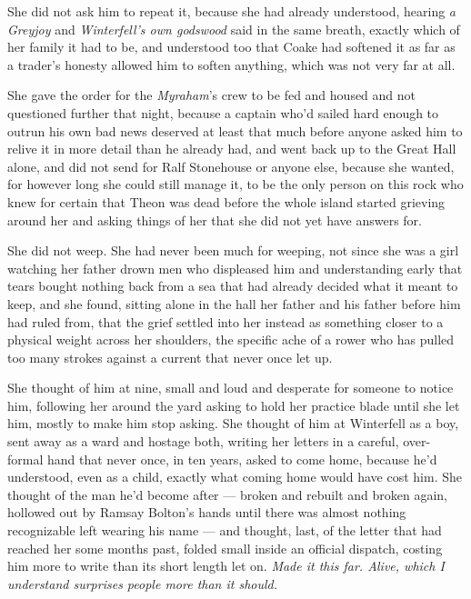 She did not ask him to repeat it, because she had already understood, hearing \textit{a Greyjoy} and \textit{Winterfell’s own godswood} said in the same breath, exactly which of her family it had to be, and understood too that Coake had softened it as far as a trader’s honesty allowed him to soften anything, which was not very far at all.

\sceneBreak

She gave the order for the \textit{Myraham}’s crew to be fed and housed and not questioned further that night, because a captain who’d sailed hard enough to outrun his own bad news deserved at least that much before anyone asked him to relive it in more detail than he already had, and went back up to the Great Hall alone, and did not send for Ralf Stonehouse or anyone else, because she wanted, for however long she could still manage it, to be the only person on this rock who knew for certain that Theon was dead before the whole island started grieving around her and asking things of her that she did not yet have answers for.

She did not weep. She had never been much for weeping, not since she was a girl watching her father drown men who displeased him and understanding early that tears bought nothing back from a sea that had already decided what it meant to keep, and she found, sitting alone in the hall her father and his father before him had ruled from, that the grief settled into her instead as something closer to a physical weight across her shoulders, the specific ache of a rower who has pulled too many strokes against a current that never once let up.

She thought of him at nine, small and loud and desperate for someone to notice him, following her around the yard asking to hold her practice blade until she let him, mostly to make him stop asking. She thought of him at Winterfell as a boy, sent away as a ward and hostage both, writing her letters in a careful, over-formal hand that never once, in ten years, asked to come home, because he’d understood, even as a child, exactly what coming home would have cost him. She thought of the man he’d become after — broken and rebuilt and broken again, hollowed out by Ramsay Bolton’s hands until there was almost nothing recognizable left wearing his name — and thought, last, of the letter that had reached her some months past, folded small inside an official dispatch, costing him more to write than its short length let on. \textit{Made it this far. Alive, which I understand surprises people more than it should.}

